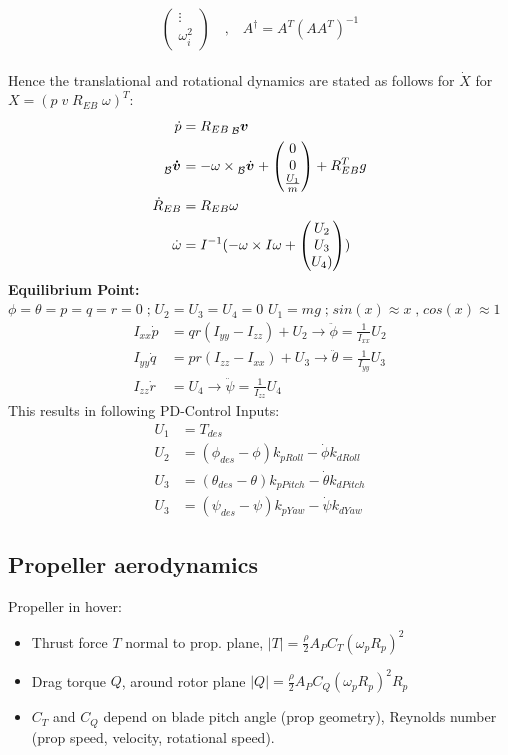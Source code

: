 \documentclass[a4paper, 8pt]{extarticle}
\newcommand{\mvec}[3]{  \prescript{}{\mathcal{#1}}{\bm{#2}}  _{#3} }
\newcommand{\mdvec}[3]{ \prescript{}{\mathcal{#1}}{\dot{\bm #2}} _{#3} }
\begin{document}
\begin{multicols*}{3}
$$\begin{pmatrix}
\vdots \\
\omega_{i}^2
\end{pmatrix} \quad \textrm{,} \quad A^{\dagger}= A^T(AA^T)^{-1}
$$\\
Hence the translational and rotational dynamics are stated as follows for $\dot{X}$ for $X=(p \; v \; R_{EB} \; \omega)^T$:
\begin{align*}
\dot{p} &= R_{EB} \mvec{B}{v}{}\\
\mvec{B}{\dot{v}}{} &=-\omega \times \mdvec{B}{v}{}+\begin{pmatrix}
0 \\ 0 \\ \frac{U_{1}}{m}
\end{pmatrix}+R_{EB}^T g\\
\dot{R}_{EB} &= R_{EB} \omega\\
\dot{\omega} &= I^{-1}(-\omega \times I\omega+\begin{pmatrix}
U_2 \\ U_3 \\ U_4)
\end{pmatrix}
)
\end{align*}
\textbf{Equilibrium Point:}\\
$ \phi=\theta=p=q=r=0 \; \textrm{;} \; U_2=U_3=U_4=0$
$U_{1}=mg \; \textrm{;} \;
sin(x) \approx x \; \textrm{,} \; cos(x) \approx 1$
\begin{align*}
    I_{xx}\dot{p} &= qr(I_{yy}-I_{zz})+U_2\rightarrow \ddot{\phi}=\frac{1}{I_{xx}}U_2\\
    I_{yy}\dot{q} &= pr(I_{zz}-I_{xx})+U_3 \rightarrow \ddot{\theta}=\frac{1}{I_{yy}}U_3\\
    I_{zz}\dot{r} &= U_{4} \rightarrow \ddot{\psi}=\frac{1}{I_{zz}}U_4
\end{align*}
This results in following PD-Control Inputs:
\begin{align*}
    U_1 &= T_{des}\\
    U_2 &= (\phi_{des}-\phi)k_{pRoll}-\dot{\phi}k_{dRoll}\\
    U_3 &= (\theta_{des}-\theta)k_{pPitch}-\dot{\theta}k_{dPitch}\\
    U_3 &= (\psi_{des}-\psi)k_{pYaw}-\dot{\psi}k_{dYaw}
\end{align*}


\subsection{Propeller aerodynamics}
Propeller in hover:
\begin{itemize}
\item Thrust force $T$ normal to prop. plane, $|T| = \frac{\rho}{2} A_P C_T(\omega_p R_p)^2$
\item Drag torque $Q$, around rotor plane $|Q| = \frac{\rho}{2} A_P C_Q(\omega_p R_p)^2R_p$
\item $C_T$ and $C_Q$ depend on blade pitch angle (prop geometry), Reynolds number (prop speed, velocity, rotational speed).
\end{itemize}


\end{multicols*}
\end{document}
